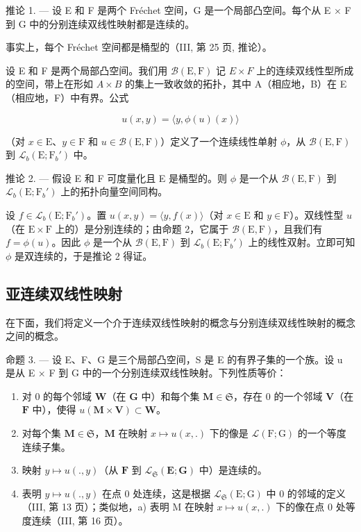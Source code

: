推论 1. --- 设 E 和 F 是两个 Fréchet 空间，G 是一个局部凸空间。每个从 E × F 到 G 中的分别连续双线性映射都是连续的。

事实上，每个 Fréchet 空间都是桶型的（III, 第 25 页, 推论）。

设 E 和 F 是两个局部凸空间。我们用 \(\mathcal{B}(\mathrm{E},\mathrm{F})\) 记 \(E \times F\) 上的连续双线性型所成的空间，带上在形如 \(A \times B\) 的集上一致收敛的拓扑，其中 A（相应地，B）在 E（相应地，F）中有界。公式

\[
u (x, y) = \langle y, \phi (u) (x) \rangle
\]

（对 \(x \in \mathrm{E}\)、\(y \in \mathrm{F}\) 和 \(u \in \mathcal{B}(\mathrm{E}, \mathrm{F})\)）定义了一个连续线性单射 \(\phi\)，从 \(\mathcal{B}(\mathrm{E}, \mathrm{F})\) 到 \(\mathcal{L}_b(\mathrm{E}; \mathrm{F}_b')\) 中。

推论 2. --- 假设 E 和 F 可度量化且 E 是桶型的。则 \(\phi\) 是一个从 \(\mathcal{B}(\mathrm{E},\mathrm{F})\) 到 \(\mathcal{L}_b(\mathrm{E};\mathrm{F}_b')\) 上的拓扑向量空间同构。

设 \(f \in \mathcal{L}_b(\mathrm{E}; \mathrm{F}_b')\)。置 \(u(x, y) = \langle y, f(x) \rangle\)（对 \(x \in \mathrm{E}\) 和 \(y \in \mathrm{F}\)）。双线性型 \(u\)（在 \(\mathrm{E} \times \mathrm{F}\) 上的）是分别连续的；由命题 2，它属于 \(\mathcal{B}(\mathrm{E}, \mathrm{F})\)，且我们有 \(f = \phi(u)\)。因此 \(\phi\) 是一个从 \(\mathcal{B}(\mathrm{E}, \mathrm{F})\) 到 \(\mathcal{L}_b(\mathrm{E}; \mathrm{F}_b')\) 上的线性双射。立即可知 \(\phi\) 是双连续的，于是推论 2 得证。

\subsection{亚连续双线性映射}

在下面，我们将定义一个介于连续双线性映射的概念与分别连续双线性映射的概念之间的概念。

命题 3. --- 设 E、F、G 是三个局部凸空间，S 是 E 的有界子集的一个族。设 u 是从 E × F 到 G 中的一个分别连续双线性映射。下列性质等价：

\begin{enumerate}
\def\labelenumi{\alph{enumi})}
\item
  对 0 的每个邻域 \(\mathbf{W}\)（在 \(\mathbf{G}\) 中）和每个集 \(\mathbf{M} \in \mathfrak{S}\)，存在 0 的一个邻域 \(\mathbf{V}\)（在 \(\mathbf{F}\) 中），使得 \(u(\mathbf{M} \times \mathbf{V}) \subset \mathbf{W}\)。
\item
  对每个集 \(\mathbf{M} \in \mathfrak{S}\)，\(\mathbf{M}\) 在映射 \(x \mapsto u(x, .)\) 下的像是 \(\mathcal{L}(\mathrm{F}; \mathrm{G})\) 的一个等度连续子集。
\item
  映射 \(y \mapsto u(., y)\)（从 \(\mathbf{F}\) 到 \(\mathcal{L}_{\mathfrak{S}}(\mathbf{E}; \mathbf{G})\) 中）是连续的。
\item
  表明 \(y \mapsto u(., y)\) 在点 0 处连续，这是根据 \(\mathcal{L}_{\mathfrak{S}}(\mathrm{E}; \mathrm{G})\) 中 0 的邻域的定义（III, 第 13 页）；类似地，a) 表明 M 在映射 \(x \mapsto u(x, .)\) 下的像在点 0 处等度连续（III, 第 16 页）。
\end{enumerate}

